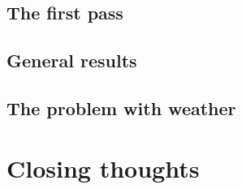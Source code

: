 \documentclass[11pt]{article} %
\begin{document}
\subsection{The first pass}
\label{sec:firstpass}
% 

\subsection{General results}
\label{sec:results}
% 
% 

\subsection{The problem with weather}
\label{sec:weather_prob}


\section{Closing thoughts}
\label{sec:summary}
% 
\end{document}
